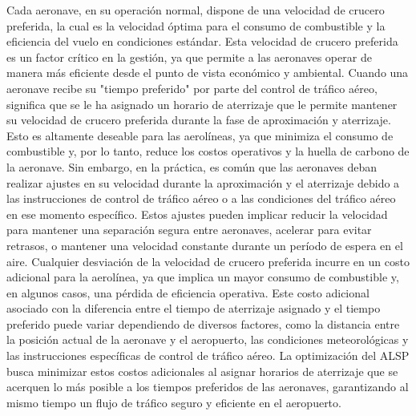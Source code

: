 \documentclass[letter, 10pt]{article}
\begin{document}
Cada aeronave, en su operaci\'on normal, dispone de una velocidad de crucero preferida, la cual es la velocidad \'optima para el consumo de combustible y la eficiencia del vuelo en condiciones est\'andar. Esta velocidad de crucero preferida es un factor cr\'itico en la gesti\'on, ya que permite a las aeronaves operar de manera m\'as eficiente desde el punto de vista econ\'omico y ambiental. Cuando una aeronave recibe su "tiempo preferido" por parte del control de tr\'afico a\'ereo, significa que se le ha asignado un horario de aterrizaje que le permite mantener su velocidad de crucero preferida durante la fase de aproximaci\'on y aterrizaje. Esto es altamente deseable para las aerol\'ineas, ya que minimiza el consumo de combustible y, por lo tanto, reduce los costos operativos y la huella de carbono de la aeronave. Sin embargo, en la pr\'actica, es com\'un que las aeronaves deban realizar ajustes en su velocidad durante la aproximaci\'on y el aterrizaje debido a las instrucciones de control de tr\'afico a\'ereo o a las condiciones del tr\'afico a\'ereo en ese momento espec\'ifico. Estos ajustes pueden implicar reducir la velocidad para mantener una separaci\'on segura entre aeronaves, acelerar para evitar retrasos, o mantener una velocidad constante durante un per\'iodo de espera en el aire. Cualquier desviaci\'on de la velocidad de crucero preferida incurre en un costo adicional para la aerol\'inea, ya que implica un mayor consumo de combustible y, en algunos casos, una p\'erdida de eficiencia operativa. Este costo adicional asociado con la diferencia entre el tiempo de aterrizaje asignado y el tiempo preferido puede variar dependiendo de diversos factores, como la distancia entre la posici\'on actual de la aeronave y el aeropuerto, las condiciones meteorol\'ogicas y las instrucciones espec\'ificas de control de tr\'afico a\'ereo. La optimizaci\'on del ALSP busca minimizar estos costos adicionales al asignar horarios de aterrizaje que se acerquen lo m\'as posible a los tiempos preferidos de las aeronaves, garantizando al mismo tiempo un flujo de tr\'afico seguro y eficiente en el aeropuerto. \\
\end{document}
